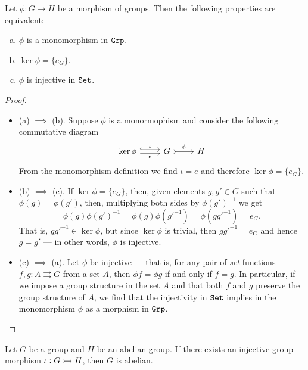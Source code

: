 \begin{proposition}
\label{prop:monic-in-grp}
Let \(\phi: G \to H\) be a morphism of groups. Then the following properties are
equivalent:
\begin{enumerate}[(a)]\setlength\itemsep{0em}
\item \(\phi\) is a monomorphism in \({\texttt{Grp}}\).

\item \(\ker \phi = \{e_G\}\).

\item \(\phi\) is injective in \({\texttt{Set}}\).
\end{enumerate}
\end{proposition}

\begin{proof}
\begin{itemize}\setlength\itemsep{0em}
\item (a) \(\implies\) (b). Suppose \(\phi\) is a monormophism and consider the
following commutative diagram
\[
\begin{tikzcd}
\ker \phi \ar[r, shift left, hook, "\iota"] \ar[r, shift right, swap, "e"]
& G \ar[r, tail, "\phi"] & H
\end{tikzcd}
\]
From the monomorphism definition we find \(\iota = e\) and therefore \(\ker \phi
= \{e_G\}\).

\item (b) \(\implies\) (c). If \(\ker\phi = \{e_G\}\), then, given elements \(g,
g' \in G\) such that \(\phi(g) = \phi(g')\), then, multiplying both sides by
\(\phi{(g')}^{-1}\) we get
\[
  \phi(g) {\phi(g')}^{-1} = \phi(g) \phi(g'^{-1}) = \phi(gg'^{-1}) = e_G.
\]
That is, \(gg'^{-1} \in \ker\phi\), but since \(\ker\phi\) is trivial, then
\(gg'^{-1} = e_G\) and hence \(g = g'\) --- in other words, \(\phi\) is
injective.

\item (c) \(\implies\) (a). Let \(\phi\) be injective --- that is, for any pair
of \emph{set}-functions \(f, g: A \rightrightarrows G\) from a set \(A\), then
\(\phi f = \phi g\) if and only if \(f = g\). In particular, if we impose a
group structure in the set \(A\) and that both \(f\) and \(g\) preserve the
group structure of \(A\), we find that the injectivity in \({\texttt{Set}}\) implies in
the monomorphism \(\phi\) as a morphism in \({\texttt{Grp}}\).
\end{itemize}
\end{proof}

\begin{proposition}
\label{prop:injective-morphism-abelian}
Let \(G\) be a group and \(H\) be an abelian group. If there exists an injective
group morphism \(\iota: G \rightarrowtail H\), then \(G\) is abelian.
\end{proposition}

